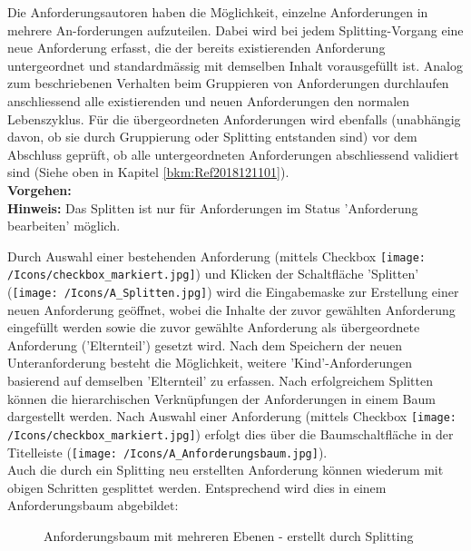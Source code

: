 Die Anforderungsautoren haben die Möglichkeit, einzelne Anforderungen in mehrere An-forderungen aufzuteilen. Dabei wird bei jedem Splitting-Vorgang eine neue Anforderung erfasst, die der bereits existierenden Anforderung untergeordnet und standardmässig mit demselben Inhalt vorausgefüllt ist. Analog zum beschriebenen Verhalten beim Gruppieren von Anforderungen durchlaufen anschliessend alle existierenden und neuen Anforderungen den normalen Lebenszyklus. Für die übergeordneten Anforderungen wird ebenfalls (unabhängig davon, ob sie durch Gruppierung oder Splitting entstanden sind) vor dem Abschluss geprüft, ob alle untergeordneten Anforderungen abschliessend validiert sind (Siehe oben in Kapitel \ref{bkm:Ref2018121101}). \\

\textbf{Vorgehen:}\\
\textbf{Hinweis:} Das Splitten ist nur für Anforderungen im Status 'Anforderung bearbeiten' möglich.

\vspace{\baselineskip}

Durch Auswahl einer bestehenden Anforderung (mittels Checkbox \texttt{[image: /Icons/checkbox\_markiert.jpg]}) und Klicken der Schaltfläche 'Splitten'  (\texttt{[image: /Icons/A\_Splitten.jpg]}) wird die Eingabemaske zur Erstellung einer neuen Anforderung geöffnet, wobei die Inhalte der zuvor gewählten Anforderung eingefüllt werden sowie die zuvor gewählte Anforderung als übergeordnete Anforderung ('Elternteil') gesetzt wird. Nach dem Speichern der neuen Unteranforderung besteht die Möglichkeit, weitere 'Kind'-Anforderungen basierend auf demselben 'Elternteil' zu erfassen.
Nach erfolgreichem Splitten können die hierarchischen Verknüpfungen der Anforderungen in einem Baum dargestellt werden. Nach Auswahl einer Anforderung (mittels Checkbox \texttt{[image: /Icons/checkbox\_markiert.jpg]}) erfolgt dies über die Baumschaltfläche in der Titelleiste (\texttt{[image: /Icons/A\_Anforderungsbaum.jpg]}).\\

Auch die durch ein Splitting neu erstellten Anforderung können wiederum mit obigen Schritten gesplittet werden. Entsprechend wird dies in einem Anforderungsbaum abgebildet:

\begin{figure}[H]
\caption{Anforderungsbaum mit mehreren Ebenen - erstellt durch Splitting}
\end{figure}

